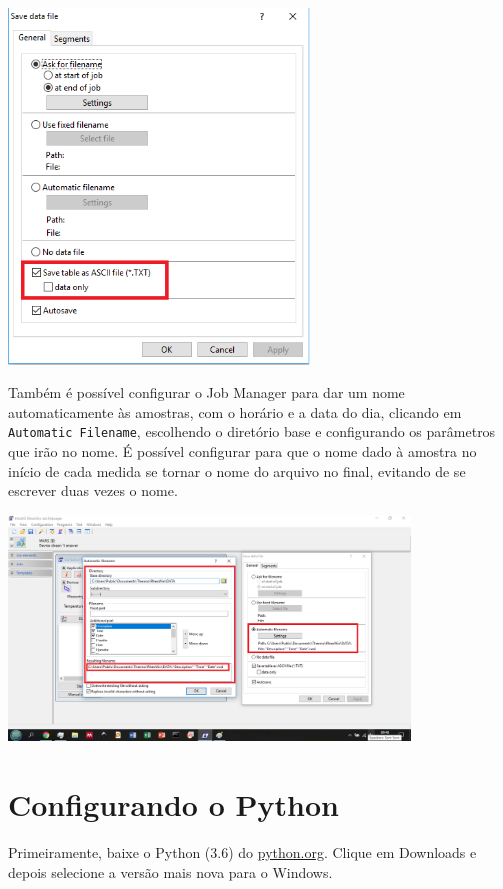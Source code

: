 \documentclass[a4paper, 12pt]{article}
\begin{document}
\begin{center}
\includegraphics[width = 0.6\textwidth]{JobMan2}
\end{center}

Também é possível configurar o Job Manager para dar um nome automaticamente às amostras, com o horário e a data do dia, clicando em \texttt{Automatic Filename}, escolhendo o diretório base e configurando os parâmetros que irão no nome. É possível configurar para que o nome dado à amostra no início de cada medida se tornar o nome do arquivo no final, evitando de se escrever duas vezes o nome.

\begin{center}
\includegraphics[width = 0.8\textwidth]{JobMan3}
\end{center}

\section{Configurando o Python}

Primeiramente, baixe o Python (3.6) do \href{http://python.org/}{python.org}. Clique em Downloads e depois selecione a versão mais nova para o Windows.
\end{document}

